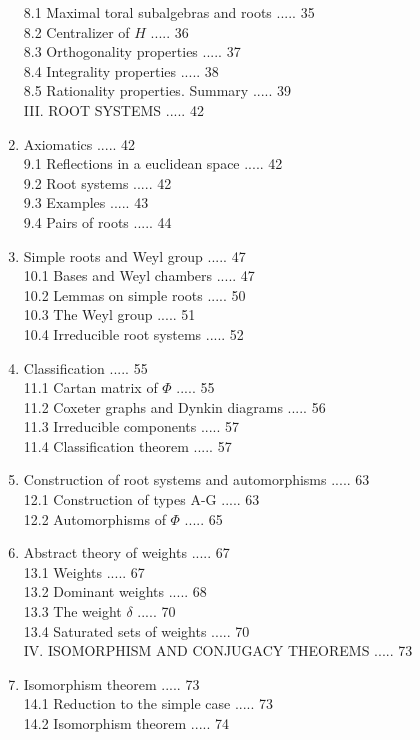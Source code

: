 \documentclass[10pt]{article}
\begin{document}
\begin{enumerate}
8.1 Maximal toral subalgebras and roots ..... 35\\
8.2 Centralizer of $H$ ..... 36\\
8.3 Orthogonality properties ..... 37\\
8.4 Integrality properties ..... 38\\
8.5 Rationality properties. Summary ..... 39\\
III. ROOT SYSTEMS ..... 42
  \item Axiomatics ..... 42\\
9.1 Reflections in a euclidean space ..... 42\\
9.2 Root systems ..... 42\\
9.3 Examples ..... 43\\
9.4 Pairs of roots ..... 44
  \item Simple roots and Weyl group ..... 47\\
10.1 Bases and Weyl chambers ..... 47\\
10.2 Lemmas on simple roots ..... 50\\
10.3 The Weyl group ..... 51\\
10.4 Irreducible root systems ..... 52
  \item Classification ..... 55\\
11.1 Cartan matrix of $\Phi$ ..... 55\\
11.2 Coxeter graphs and Dynkin diagrams ..... 56\\
11.3 Irreducible components ..... 57\\
11.4 Classification theorem ..... 57
  \item Construction of root systems and automorphisms ..... 63\\
12.1 Construction of types A-G ..... 63\\
12.2 Automorphisms of $\Phi$ ..... 65
  \item Abstract theory of weights ..... 67\\
13.1 Weights ..... 67\\
13.2 Dominant weights ..... 68\\
13.3 The weight $\delta$ ..... 70\\
13.4 Saturated sets of weights ..... 70\\
IV. ISOMORPHISM AND CONJUGACY THEOREMS ..... 73
  \item Isomorphism theorem ..... 73\\
14.1 Reduction to the simple case ..... 73\\
14.2 Isomorphism theorem ..... 74\\

\end{enumerate}
\end{document}
